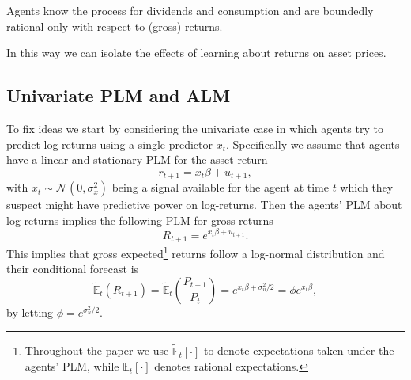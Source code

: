 \documentclass[11pt]{article}
\begin{document}
\begin{assumption}
    Agents know the process for dividends and consumption and are boundedly rational only with respect to (gross) returns.
\end{assumption}
In this way we can isolate the effects of learning about returns on asset prices.

\subsection{Univariate PLM and ALM}

To fix ideas we start by considering the univariate case in which agents try to predict log-returns using a single predictor $x_t$.
Specifically we assume that agents have a linear and stationary PLM for the asset return
\begin{equation}\label{eq:plm_univariate}
    r_{t+1} =  x_{t} \beta + u_{t+1},
\end{equation}
with $x_t \sim \mathcal{N}(0, \sigma^2_x)$ being a signal available for the agent at time $t$ which they suspect might have predictive power on log-returns.
Then the agents' PLM about log-returns implies the following PLM for gross returns
\begin{equation}
    R_{t+1} = e ^ {x_{t} \beta + u_{t+1}}.
\end{equation}
This implies that gross expected\footnote{
Throughout the paper we use $\tilde{\mathbb{E}}_t[\cdot]$ to denote expectations taken under the agents' PLM, while $\mathbb{E}_t[\cdot]$ denotes rational expectations.}
 returns follow a log-normal distribution and their conditional forecast is
\begin{equation}
    \tilde{\mathbb{E}}_t(R_{t+1}) = \tilde{\mathbb{E}}_t\left(\frac{P_{t+1}}{P_t}\right) = e^{x_{t} \beta + \sigma^2_u / 2} = \phi e^{x_{t} \beta},   
\end{equation}
by letting $\phi = e^{\sigma^2_u / 2}$.
\end{document}
